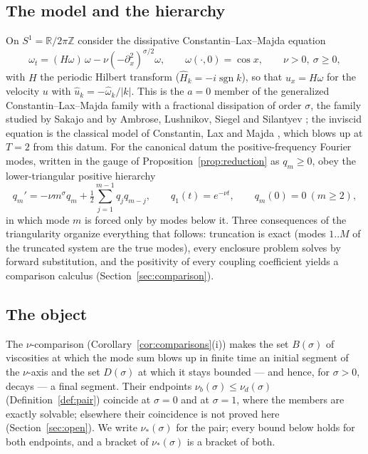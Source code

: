 \documentclass[11pt,a4paper]{article}
\theoremstyle{plain}
\theoremstyle{definition}
\newcommand{\R}{\mathbb{R}}
\newcommand{\Sone}{S^1}
\newcommand{\abs}[1]{\lvert #1 \rvert}
\DeclareMathOperator{\sgn}{sgn}
\begin{document}
\subsection{The model and the hierarchy}
On $\Sone=\R/2\pi\mathbb{Z}$ consider the dissipative Constantin--Lax--Majda equation
\begin{equation}\label{eq:pde}
\omega_t=(H\omega)\,\omega-\nu(-\partial_x^2)^{\sigma/2}\omega,\qquad \omega(\cdot,0)=\cos x,\qquad \nu>0,\ \sigma\ge0,
\end{equation}
with $H$ the periodic Hilbert transform ($\hat H_k=-i\sgn k$), so that $u_x=H\omega$ for the velocity $u$ with $\hat u_k=-\hat\omega_k/\abs{k}$. This is the $a=0$ member of the generalized Constantin--Lax--Majda family \cite{OSW08} with a fractional dissipation of order $\sigma$, the family studied by Sakajo \cite{Sak03a,Sak03b,Sak03c} and by Ambrose, Lushnikov, Siegel and Silantyev \cite{ALSS24}; the inviscid equation is the classical model of Constantin, Lax and Majda \cite{CLM85}, which blows up at $T=2$ from this datum. For the canonical datum the positive-frequency Fourier modes, written in the gauge of Proposition~\ref{prop:reduction} as $q_m\ge0$, obey the lower-triangular positive hierarchy
\begin{equation}\label{eq:hier}
q_m'=-\nu m^\sigma q_m+\tfrac12\sum_{j=1}^{m-1}q_jq_{m-j},\qquad q_1(t)=e^{-\nu t},\qquad q_m(0)=0\ (m\ge2),
\end{equation}
in which mode $m$ is forced only by modes below it. Three consequences of the triangularity organize everything that follows: truncation is exact (modes $1..M$ of the truncated system are the true modes), every enclosure problem solves by forward substitution, and the positivity of every coupling coefficient yields a comparison calculus (Section~\ref{sec:comparison}).

\subsection{The object}
The $\nu$-comparison (Corollary~\ref{cor:comparisons}(i)) makes the set $B(\sigma)$ of viscosities at which the mode sum blows up in finite time an initial segment of the $\nu$-axis and the set $D(\sigma)$ at which it stays bounded --- and hence, for $\sigma>0$, decays --- a final segment. Their endpoints $\nu_b(\sigma)\le\nu_d(\sigma)$ (Definition~\ref{def:pair}) coincide at $\sigma=0$ and at $\sigma=1$, where the members are exactly solvable; elsewhere their coincidence is not proved here (Section~\ref{sec:open}). We write $\nu_*(\sigma)$ for the pair; every bound below holds for both endpoints, and a bracket of $\nu_*(\sigma)$ is a bracket of both.
\end{document}
